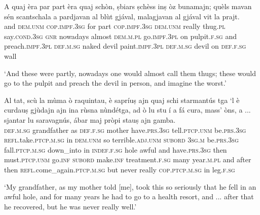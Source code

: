  \begin{linenumbers}
\gll  A quaj èra par part èra quaj schòn, ṣbiars ṣchèss inṣ òz bunamajn; quèls mavan sén scantschala a pardjavan al blùt gjával, malagjavan al gjával vit la prajt. \\
and  \textsc{dem.unm} \textsc{cop.impf.3sg} for part \textsc{cop.impf.3sg} \textsc{dem.unm} really thug.\textsc{pl} say.\textsc{cond.3sg} \textsc{gnr} nowadays almost \textsc{dem.m.pl} go.\textsc{impf.3pl} on pulpit.\textsc{f.sg} and preach.\textsc{impf.3pl} \textsc{def.m.sg} naked devil paint.\textsc{impf.3pl} \textsc{def.m.sg} devil on \textsc{def.f.sg} wall\\
\end{linenumbers}
\medskip
\glt `And these were partly, nowadays one would almost call them thugs; these would go to the pulpit and preach the devil in person, and imagine the worst.'
\medskip

\begin{linenumbers}
\gll  Al tat, scù la mùma ò raquintau, è sapríuṣ ajn quaj schi starmantús tga `l è curdauṣ gjùdajn ajn ina rùsna nùndétga, ad ò lu stu í a fá cura, mass’ òns, a ... sjantar lu saravagnús, ábar maj pròpi stauṣ ajn gamba.  \\
 \textsc{def.m.sg} grandfather as  \textsc{def.f.sg} mother have.\textsc{prs.3sg} tell.\textsc{ptcp.unm} be.\textsc{prs.3sg} \textsc{refl.}take.\textsc{ptcp.m.sg} in \textsc{dem.unm} so terrible.\textsc{adj.unm} \textsc{subord} \textsc{3sg.m} be.\textsc{prs.3sg} fall.\textsc{ptcp.m.sg} down\_into in \textsc{indef.f.sg} hole awful and have.\textsc{prs.3sg} then must.\textsc{ptcp.unm} go.\textsc{inf} \textsc{subord} make.\textsc{inf} treatment.\textsc{f.sg} many year.\textsc{m.pl} and {} after then \textsc{refl}.come\_again.\textsc{ptcp.m.sg} but never really \textsc{cop.ptcp.m.sg} in leg.\textsc{f.sg}\\
\end{linenumbers}
\medskip
\glt `My grandfather, as my mother told [me], took this so seriously that he fell in an awful hole, and for many years he had to go to a health resort, and ... after that he recovered, but he  was never really well.'
\medskip

